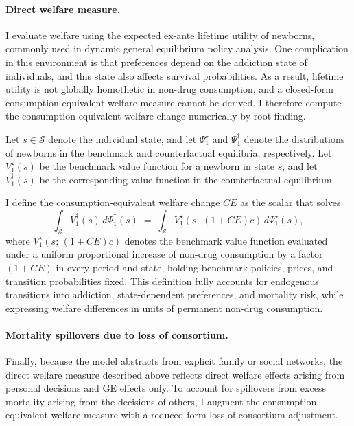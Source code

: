 \documentclass[parskip=full]{article}
\theoremstyle{plain}
\theoremstyle{definition}
\theoremstyle{remark}
\begin{document}
\paragraph{Direct welfare measure.}
I evaluate welfare using the expected ex-ante lifetime utility of newborns, commonly used in dynamic general equilibrium policy analysis. One complication in this environment is that preferences depend on the addiction state of individuals, and this state also affects survival probabilities. As a result, lifetime utility is not globally homothetic in non-drug consumption, and a closed-form consumption-equivalent welfare measure cannot be derived. I therefore compute the consumption-equivalent welfare change numerically by root-finding.

Let $s\in\mathcal S$ denote the individual state, and let $\Psi^{\star}_1$ and $\Psi^{\dagger}_1$ denote the distributions of newborns in the benchmark and counterfactual equilibria, respectively. Let $V^{\star}_1(s)$ be the benchmark value function for a newborn in state $s$, and let $V^{\dagger}_1(s)$ be the corresponding value function in the counterfactual equilibrium.

I define the consumption-equivalent welfare change $CE$ as the scalar that solves
\begin{equation}\label{eq:CE_def}
\int_{\mathcal S} V^{\dagger}_1(s)\, d\Psi^{\dagger}_1(s)
\;=\;\int_{\mathcal S} V^{\star}_1\!\left(s;\,(1+CE)c\right)\, d\Psi^{\star}_1(s),
\end{equation}
where $V^{\star}_1(s;\,(1+CE)c)$ denotes the benchmark value function evaluated under a uniform proportional increase of non-drug consumption by a factor $(1+CE)$ in every period and state, holding benchmark policies, prices, and transition probabilities fixed. This definition fully accounts for endogenous transitions into addiction, state-dependent preferences, and mortality risk, while expressing welfare differences in units of permanent non-drug consumption.

\paragraph{Mortality spillovers due to loss of consortium.}
Finally, because the model abstracts from explicit family or social networks, the direct welfare measure described above reflects direct welfare effects arising from personal decisions and GE effects only. To account for spillovers from excess mortality arising from the decisions of others, I augment the consumption-equivalent welfare measure with a reduced-form loss-of-consortium adjustment.
\end{document}
